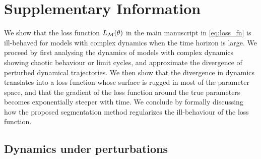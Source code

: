
\graphicspath{{./content/chap3_mini-batching/}}


\section{Supplementary Information}
\label{secSI:mini-batching}

We show that the loss function $L_{\mathcal{M}}(\theta)$ in the main manuscript in \cref{eq:loss_fn} is ill-behaved for models with complex dynamics when the time horizon is large. We proceed by first analysing the dynamics of models with complex dynamics showing chaotic behaviour or limit cycles, and approximate the divergence of perturbed dynamical trajectories. We then show that the divergence in dynamics translates into a loss function whose surface is rugged in most of the parameter space, and that the gradient of the loss function around the true parameters becomes exponentially steeper with time. We conclude by formally discussing how the proposed segmentation method regularizes the ill-behaviour of the loss function.

\subsection{Dynamics under perturbations}

